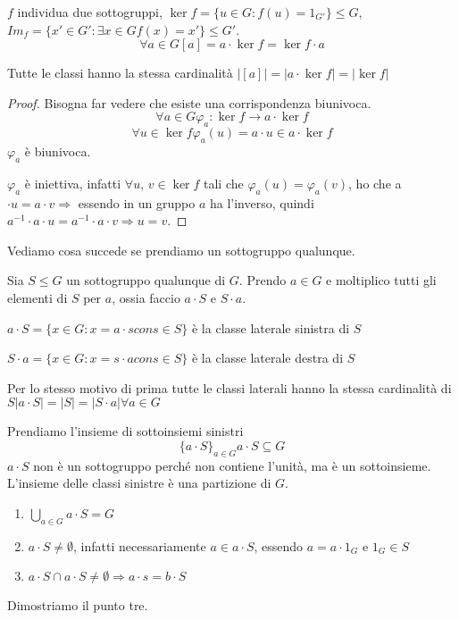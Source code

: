 $f$ individua due sottogruppi, $\ker f = \{ u \in G : f(u) = 1_{G'} \} \le G$, $Im_f = \{ x' \in G' : \exists x \in G f(x) = x'\} \le G'$. 
\[
\forall a \in G [a] = a \cdot \ker f = \ker f \cdot a
\]
\begin{prop}
Tutte le classi hanno la stessa cardinalit\`a $|[a]| = |a \cdot \ker f| = |\ker f|$
\end{prop}
\begin{proof}
Bisogna far vedere che esiste una corrispondenza biunivoca.
\[
\forall a \in G \varphi_a : \ker f \to a \cdot \ker f
\]
\[
\forall u \in \ker f \varphi_a (u) = a \cdot u \in a \cdot \ker f
\]
$\varphi_a$ \`e biunivoca. 

$\varphi_a$ \`e iniettiva, infatti $\forall u$, $v \in \ker f $ tali che $\varphi_a (u) = \varphi_a (v)$, ho che a $\cdot u = a \cdot v \Rightarrow$ essendo in un gruppo $a$ ha l'inverso, quindi $a^{-1} \cdot a \cdot u = a^{-1} \cdot a \cdot v \Rightarrow u = v$.
\end{proof}

Vediamo cosa succede se prendiamo un sottogruppo qualunque.

Sia $S \le G$ un sottogruppo qualunque di $G$. Prendo $a \in G$ e moltiplico tutti gli elementi di $S$ per $a$, ossia faccio $a \cdot S$ e $S \cdot a$.

$a \cdot S = \{ x \in G : x = a \cdot s con s \in S \}$ \`e la classe laterale sinistra di $S$

$S \cdot a = \{ x \in G : x = s \cdot a con s \in S \}$ \`e la classe laterale destra di $S$

Per lo stesso motivo di prima tutte le classi laterali hanno la stessa cardinalit\`a di $S |a \cdot S| = |S| = |S \cdot a| \forall a \in G$

Prendiamo l'insieme di sottoinsiemi sinistri
\[
\{ a \cdot S\}_{a \in G} a \cdot S \subseteq G
\]
$a \cdot S$ non \`e un sottogruppo perch\'e non contiene l'unit\`a, ma \`e un sottoinsieme. L'insieme delle classi sinistre \`e una partizione di $G$.
\begin{enumerate}
    \item $\bigcup_{a \in G} a \cdot S = G$
    \item $a \cdot S \neq \emptyset$, infatti necessariamente $a \in a \cdot S$, essendo $a = a \cdot 1_G$ e $1_G \in S$
    \item $a \cdot S \cap a \cdot S \neq \emptyset \Rightarrow a \cdot s = b \cdot S$
\end{enumerate}
Dimostriamo il punto tre.

